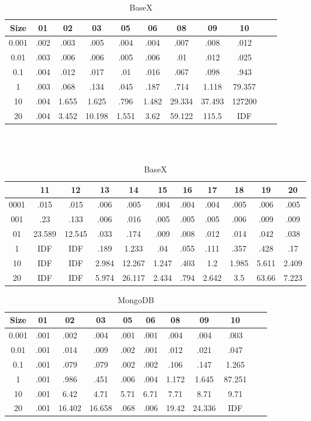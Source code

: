 \begin{center}
\begin{table}[ht]
\tiny
\label{basex-query-result-table}
\caption{BaseX}
\begin{tabular}{|c|c|c|c|c|c|c|c|c|c|c| } 
 Size & 01 & 02 & 03 & 05 & 06 & 08 & 09 & 10 \\
 \hline
0.001 & .002 & .003 & .005 & .004 & .004 & .007 & .008 & .012 \\
0.01 & .003 & .006 & .006 & .005 & .006 & .01 & .012 & .025 \\
0.1 & .004 & .012 & .017 & .01 & .016 & .067 & .098 & .943 \\
1 & .003 & .068 & .134 & .045 & .187 & .714 & 1.118 & 79.357 \\
10 & .004 & 1.655 & 1.625 & .796 & 1.482 & 29.334 & 37.493 & 127200 \\
20 & .004 & 3.452 & 10.198 & 1.551 & 3.62 & 59.122 & 115.5 & IDF \\

\end{tabular}
\\
\\
\begin{tabular}{|c|c|c|c|c|c|c|c|c|c|c| } 
 & 11 & 12 & 13 & 14 & 15 & 16 & 17 & 18 & 19 & 20 \\
 \hline
0001 & .015 & .015 & .006 & .005 & .004 & .004 & .004 & .005 & .006 & .005 \\
001 & .23 & .133 & .006 & .016 & .005 & .005 & .005 & .006 & .009 & .009 \\
01 & 23.589 & 12.545 & .033 & .174 & .009 & .008 & .012 & .014 & .042 & .038 \\
1 & IDF & IDF & .189 & 1.233 & .04 & .055 & .111 & .357 & .428 & .17 \\
10 & IDF & IDF & 2.984 & 12.267 & 1.247 & .403 & 1.2 & 1.985 & 5.611 & 2.409 \\
20 & IDF & IDF & 5.974 & 26.117 & 2.434 & .794 & 2.642 & 3.5 & 63.66 & 7.223 \\
\end{tabular}
\end{table}

\begin{table} [ht]
\tiny
\caption{MongoDB}
\label{mongodb-query-result-table}
\begin{tabular}{|c|c|c|c|c|c|c|c|c|c|c| } 
Size & 01 & 02 & 03 & 05 & 06 & 08 & 09 & 10 \\
\hline
0.001 & .001 & .002 & .004 & .001 & .001 & .004 & .004 & .003 \\
0.01 & .001 & .014 & .009 & .002 & .001 & .012 & .021 & .047 \\
0.1 & .001 & .079 & .079 & .002 & .002 & .106 & .147 & 1.265 \\
1 & .001 & .986 & .451 & .006 & .004 & 1.172 & 1.645 & 87.251 \\
10 & .001 & 6.42 & 4.71 & 5.71 & 6.71 & 7.71 & 8.71 & 9.71 \\
20 & .001 & 16.402 & 16.658 & .068 & .006 & 19.42 & 24.336 & IDF \\


\end{tabular}
\end{table}
\end{center}

